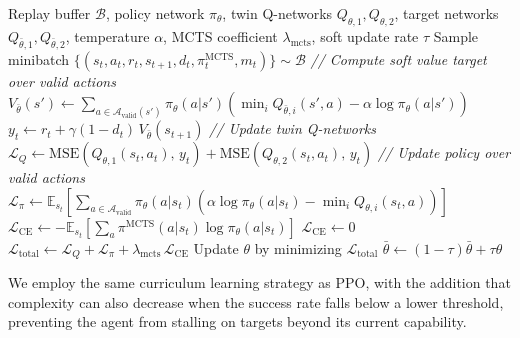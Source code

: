 \documentclass{article} %
\begin{document}
\begin{algorithm}[h]
\caption{Discrete SAC with MCTS Distillation}
\label{alg:sac}
\begin{algorithmic}[1]
\REQUIRE Replay buffer $\mathcal{B}$, policy network $\pi_\theta$, twin Q-networks $Q_{\theta,1}, Q_{\theta,2}$, target networks $Q_{\bar{\theta},1}, Q_{\bar{\theta},2}$, temperature $\alpha$, MCTS coefficient $\lambda_{\text{mcts}}$, soft update rate $\tau$
    \STATE Sample minibatch $\{(s_t, a_t, r_t, s_{t+1}, d_t, \pi^{\text{MCTS}}_t, m_t)\} \sim \mathcal{B}$
    \STATE \textit{// Compute soft value target over valid actions}
    \STATE $V_{\bar{\theta}}(s') \leftarrow \sum_{a \in \mathcal{A}_{\text{valid}}(s')} \pi_\theta(a|s')\left(\min_i Q_{\bar{\theta},i}(s',a) - \alpha \log \pi_\theta(a|s')\right)$
    \STATE $y_t \leftarrow r_t + \gamma(1 - d_t)\, V_{\bar{\theta}}(s_{t+1})$
    \STATE \textit{// Update twin Q-networks}
    \STATE $\mathcal{L}_Q \leftarrow \text{MSE}(Q_{\theta,1}(s_t, a_t),\, y_t) + \text{MSE}(Q_{\theta,2}(s_t, a_t),\, y_t)$
    \STATE \textit{// Update policy over valid actions}
    \STATE $\mathcal{L}_\pi \leftarrow \mathbb{E}_{s_t}\!\left[\sum_{a \in \mathcal{A}_{\text{valid}}} \pi_\theta(a|s_t)\left(\alpha \log \pi_\theta(a|s_t) - \min_i Q_{\theta,i}(s_t, a)\right)\right]$
        \STATE $\mathcal{L}_{\text{CE}} \leftarrow -\mathbb{E}_{s_t}\!\left[\sum_a \pi^{\text{MCTS}}(a|s_t) \log \pi_\theta(a|s_t)\right]$
    \ELSE
        \STATE $\mathcal{L}_{\text{CE}} \leftarrow 0$
    \ENDIF
    \STATE $\mathcal{L}_{\text{total}} \leftarrow \mathcal{L}_Q + \mathcal{L}_\pi + \lambda_{\text{mcts}}\, \mathcal{L}_{\text{CE}}$
    \STATE Update $\theta$ by minimizing $\mathcal{L}_{\text{total}}$
    \STATE $\bar{\theta} \leftarrow (1 - \tau)\bar{\theta} + \tau\theta$
\ENDFOR
\end{algorithmic}
\end{algorithm}

We employ the same curriculum learning strategy as PPO, with the addition that complexity can also decrease when the success rate falls below a lower threshold, preventing the agent from stalling on targets beyond its current capability.

\end{document}
